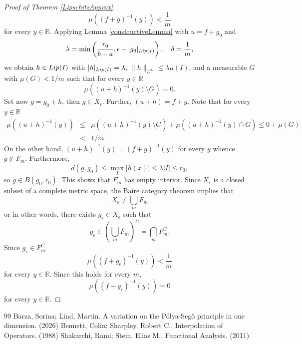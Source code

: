 \documentclass[10pt,a4paper]{amsart}
\numberwithin{equation}{section}
\begin{document}
\begin{proof}[Proof of Theorem \ref{LipschitzApprox}]
\begin{equation}
    \nonumber
    \mu((f+g)^{-1}(y))<\frac{1}{m}
\end{equation}
for every $y\in\mathbb{R}$.
Applying Lemma \ref{constructiveLemma} with $u=f+g_0$ and
$$
\lambda=\min\left(\frac{r_0}{b-a}, \epsilon-|g_0|_{{\rm Lip}(I)}\right),\quad\delta=\frac{1}{m},
$$
we obtain $h\in{\rm Lip}(I)$ with $|h|_{{\rm Lip}(I)}=\lambda$, $\|h\|_{L^\infty}\le\lambda\mu(I)$, and a measurable $G$ with $\mu(G)<1/m$ such that for every $y\in\mathbb{R}$
$$
\mu((u+h)^{-1}(y)\setminus G)=0.
$$
Set now $g=g_0+h$, then $g\in X_\epsilon$. Further, $(u+h)=f+g$. Note that for every $y\in\mathbb{R}$
\begin{eqnarray}
    \nonumber
    \mu((u+h)^{-1}(y))&\le&\mu((u+h)^{-1}(y)\setminus G)+\mu((u+h)^{-1}(y)\cap G)\le 0+\mu(G)\\
    \nonumber
    &<&1/m.
\end{eqnarray}
On the other hand, $(u+h)^{-1}(y)=(f+g)^{-1}(y)$ for every $y$ whence $g\notin F_m$. Furthermore,
$$
d(g,g_0)\le\max_I|h(x)|\le\lambda|I|\le r_0,
$$
so $g\in B(g_0,r_0)$. This shows that $F_m$ has empty interior.
Since  $X_\epsilon$ is a closed subset of a complete metric space, the Baire category theorem implies that
$$
X_\epsilon\neq\bigcup_mF_m
$$
or in other words, there exists $g_\epsilon\in X_\epsilon$ such that
$$
g_\epsilon\in \left(\bigcup_mF_m\right)^C=\bigcap_m F_m^C.
$$
Since $g_\epsilon\in F_m^C$
\begin{equation}
    \nonumber
    \mu((f+g_\epsilon)^{-1}(y))<\frac{1}{m}
\end{equation}
for every $y\in\mathbb{R}$. Since this holds for every $m$,
\begin{equation}
    \nonumber
    \mu((f+g_\epsilon)^{-1}(y))=0
\end{equation}
for every $y\in\mathbb{R}$.
\end{proof}


\begin{thebibliography}{99}
 Barza, Sorina; Lind, Martin. A variation on the {P\'{o}}lya-{Seg\H{o}} principle in one dimension. (2026)
 Bennett, Colin; Sharpley, Robert C.. Interpolation of Operators. (1988)
 Shakarchi, Rami; Stein, Elias M.. Functional Analysis. (2011)
\end{thebibliography}
\end{document}
